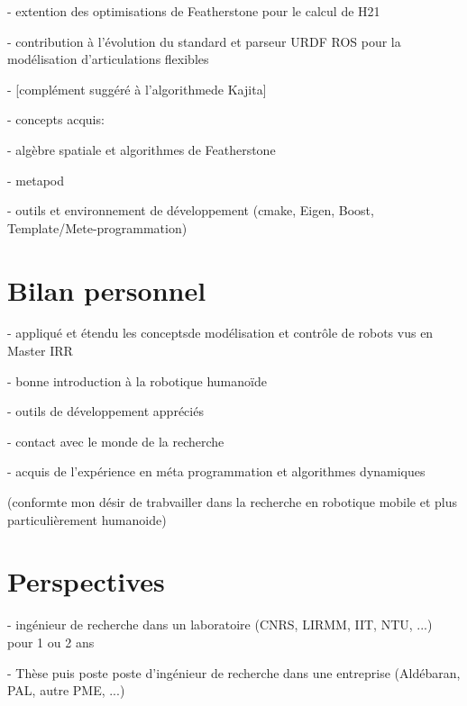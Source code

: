 \documentclass{report}
\begin{document}
	- extention des optimisations de Featherstone pour le calcul de H21
	
	- contribution à l'évolution du standard et parseur URDF ROS pour la modélisation d'articulations flexibles
	
	- [complément suggéré à l'algorithmede Kajita]


- concepts acquis:

	- algèbre spatiale et algorithmes de Featherstone
	
	- metapod
	
	- outils et environnement de développement (cmake, Eigen, Boost, Template/Mete-programmation)



\section*{Bilan personnel}

- appliqué et étendu les conceptsde modélisation et contrôle de robots vus en Master IRR

- bonne introduction à la robotique humanoïde

- outils de développement appréciés

- contact avec le monde de la recherche

- acquis de l'expérience en méta programmation et algorithmes dynamiques

(conformte mon désir de trabvailler dans la recherche en robotique mobile et plus particulièrement humanoide)

\section*{Perspectives}

- ingénieur de recherche dans un laboratoire (CNRS, LIRMM, IIT, NTU, ...) pour 1 ou 2 ans

- Thèse puis poste poste d'ingénieur de recherche dans une entreprise (Aldébaran, PAL, autre PME, ...)



\appendix




\clearpage
{}

\end{document}

